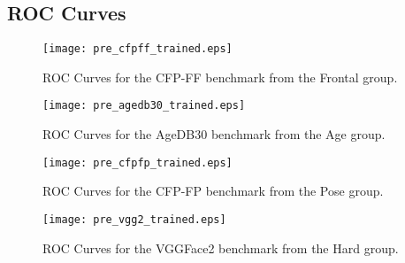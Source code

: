 \documentclass[class=report, crop=false, a4paper, 12pt]{standalone}
\begin{document}
\begin{appendix}
\chapter{ROC Curves}\label{appendix:roc_curves_appendix}
\begin{figure}[H]
    \centering
    \begin{adjustbox}{center, minipage=1.1\textwidth, margin=0cm -0.1cm 0cm -0.1cm}  %
        \begin{minipage}[c]{0.49\textwidth}
            \centering
            \texttt{[image: pre\_cfpff\_trained.eps]}
            \caption{ROC Curves for the CFP-FF benchmark from the Frontal group.}
            \label{fig:roc_lfw}
        \end{minipage}
        \hfill
        \begin{minipage}[c]{0.49\textwidth}
            \centering
            \texttt{[image: pre\_agedb30\_trained.eps]}
            \caption{ROC Curves for the AgeDB30 benchmark from the Age group.}
            \label{fig:roc_calfw}
        \end{minipage}
    \end{adjustbox}
    \vspace{-0.4cm}
  \end{figure}
\vspace{-1cm}
\begin{figure}[H]
  \begin{adjustbox}{center, minipage=1.1\textwidth, margin=0cm -0.1cm 0cm -0.1cm}  %
      \begin{minipage}[c]{0.49\textwidth}
          \centering
          \texttt{[image: pre\_cfpfp\_trained.eps]}
          \caption{ROC Curves for the CFP-FP benchmark from the Pose group.}
          \label{fig:roc_cplfw}
      \end{minipage}
      \hfill
      \begin{minipage}[c]{0.49\textwidth}
          \centering
          \texttt{[image: pre\_vgg2\_trained.eps]}
          \caption{ROC Curves for the VGGFace2 benchmark from the Hard group.}
          \label{fig:roc_xqlfw}
      \end{minipage}
  \end{adjustbox}
  \vspace{-0.4cm}
\end{figure}



\end{appendix}
\end{document}
